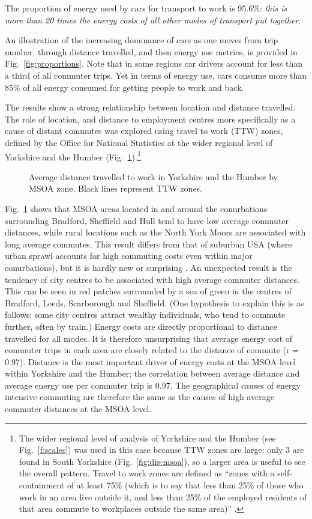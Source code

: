 \documentclass[a4paper, 11pt, twoside]{Thesis}
\begin{document}
The proportion of energy
used by cars for transport to work is 95.6\%: \emph{this is more than 20 times
the energy costs of all other modes of transport put together}.

An illustration of the increasing dominance of cars as one moves from trip
number, through distance travelled, and then energy use metrics, is provided in
Fig.~\ref{fig:proportions}. Note that in some regions car drivers account for
less than a third of all commuter trips. Yet in terms of energy use, cars
consume more than 85\% of all energy consumed for getting people to work and
back.

The results show a strong relationship between location and
 distance travelled.
The role of location, and distance to employment centres
more specifically as a cause of distant
commutes was explored using travel to work (TTW) zones, defined by the Office
for National Statistics at the wider regional level of Yorkshire and the Humber
(Fig.~\ref{fig:map1}).\footnote{The
wider regional level of analysis of
Yorkshire and the Humber (see Fig.~\ref{f:scales}) was used in this case
because TTW zones are large: only 3 are found in South Yorkshire
(Fig.~\ref{fig:dis-msoa}), so a larger area is useful to see the overall
pattern. Travel to work zones are defined as ``zones with a self- containment of
at least 75\% (which is to say that less than 25\% of those who work in an area
live outside it, and less than 25\% of the employed residents of that area
commute to workplaces outside the same area)'' \citep{Coombes1982}.
}
\begin{figure}[h]
 \centering
 \caption[Average distance travelled to work in Yorkshire and the Humber]
 {Average distance travelled to work in Yorkshire and the Humber by MSOA
zone. Black lines represent TTW zones.}
 \label{fig:map1}
\end{figure}
Fig.~\ref{fig:map1} shows that MSOA areas located in and
around the conurbations surrounding Bradford, Sheffield and Hull tend to have
low average commuter distances, while rural locations such as the North
York Moors are associated with long average commutes. This result differs
from that of suburban USA (where urban sprawl accounts for high commuting costs
even within major conurbations), but it is hardly new or surprising
\citep{Marshall2008, Sexton2011}.
An unexpected result is the tendency of city centres to be associated
with high average commuter distances. This can be seen in red patches surrounded
by a sea of green in the centres of Bradford, Leeds, Scarborough and Sheffield.
(One hypothesis to explain this is as follows: some city centres attract
wealthy individuals, who tend to commute further, often by train.)
Energy costs are directly proportional to distance travelled for all
modes. It is therefore unsurprising that average energy cost of commuter trips in each area
are closely related to the distance of commute (r = 0.97).
Distance is the most important driver of energy costs at the MSOA level within
Yorkshire and the Humber; the correlation between average distance and average
energy use per commuter trip is 0.97.
The
geographical causes of energy intensive commuting are therefore the same as the
causes of high average commuter distances at the MSOA level.
\end{document}
